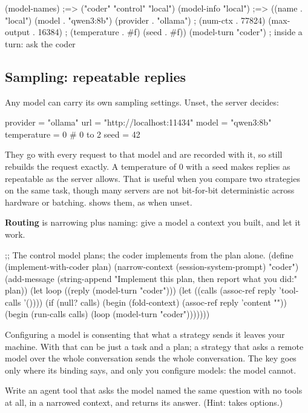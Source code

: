 \begin{scm}
(model-names)                ;=> ("coder" "control" "local")
(model-info "local")         ;=> ((name . "local") (model . "qwen3:8b") (provider . "ollama")
                             ;    (num-ctx . 77824) (max-output . 16384)
                             ;    (temperature . #f) (seed . #f))
(model-turn "coder")         ; inside a turn: ask the coder
\end{scm}

\subsection{Sampling: repeatable replies}

Any model can carry its own sampling settings. Unset, the server decides:

\begin{toml}
provider = "ollama"
url = "http://localhost:11434"
model = "qwen3:8b"
temperature = 0          # 0 to 2
seed = 42
\end{toml}

They go with every request to that model and are recorded with it, so
 still rebuilds the request exactly. A
temperature of 0 with a seed makes replies as repeatable as the server
allows. That is useful when you compare two strategies on the same task,
though many servers are not bit-for-bit deterministic across hardware or
batching.  shows them, as  when unset.

\textbf{Routing} is narrowing plus naming: give a model a context you
built, and let it work.

\begin{scm}
;; The control model plans; the coder implements from the plan alone.
(define (implement-with-coder plan)
  (narrow-context (session-system-prompt) "coder")
  (add-message (string-append "Implement this plan, then report what you did:\n" plan))
  (let loop ((reply (model-turn "coder")))
    (let ((calls (assoc-ref reply 'tool-calls '())))
      (if (null? calls)
          (begin (fold-context) (assoc-ref reply 'content ""))
          (begin (run-calls calls)
                 (loop (model-turn "coder")))))))
\end{scm}

\begin{careful}
Configuring a model is consenting that what a strategy sends it leaves
your machine. With  that can be just a task and a
plan; a strategy that asks a remote model over the whole conversation sends
the whole conversation. The key goes only where its binding says, and only
you configure models: the model cannot.
\end{careful}

\begin{puzzle}
Write an agent tool  that asks the model named
 the same question with no tools at all, in a narrowed
context, and returns its answer. (Hint:  takes options.)
\end{puzzle}
